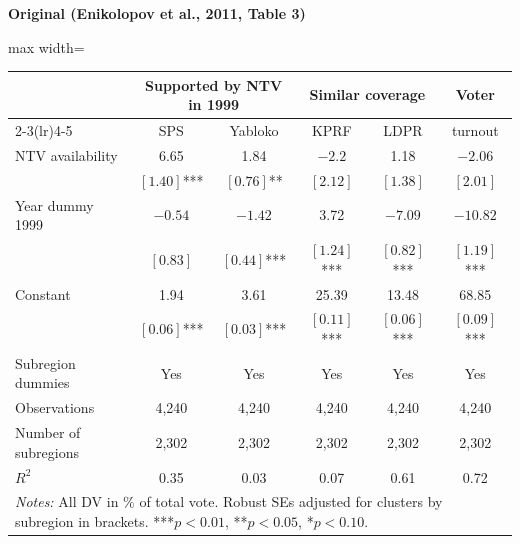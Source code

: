 \documentclass[11pt,a4paper]{article}
\begin{document}
\vspace{0.5cm}
\begin{minipage}[t]{0.48\textwidth}
\centering
\textbf{\large Original (Enikolopov et al., 2011, Table 3)}
\vspace{0.3cm}

\begin{adjustbox}{max width=\textwidth}
\begin{tabular}{lccccc}
\toprule
 & \multicolumn{2}{c}{Supported by NTV in 1999} & \multicolumn{2}{c}{Similar coverage} & Voter \\
\cmidrule(lr){2-3}\cmidrule(lr){4-5}
 & SPS & Yabloko & KPRF & LDPR & turnout \\
\midrule
NTV availability & 6.65 & 1.84 & $-2.2$ & 1.18 & $-2.06$ \\
 & $[1.40]$*** & $[0.76]$** & $[2.12]$ & $[1.38]$ & $[2.01]$ \\[0.3em]
Year dummy 1999 & $-0.54$ & $-1.42$ & 3.72 & $-7.09$ & $-10.82$ \\
 & $[0.83]$ & $[0.44]$*** & $[1.24]$*** & $[0.82]$*** & $[1.19]$*** \\[0.3em]
Constant & 1.94 & 3.61 & 25.39 & 13.48 & 68.85 \\
 & $[0.06]$*** & $[0.03]$*** & $[0.11]$*** & $[0.06]$*** & $[0.09]$*** \\[0.3em]
\midrule
Subregion dummies & Yes & Yes & Yes & Yes & Yes \\
Observations & 4,240 & 4,240 & 4,240 & 4,240 & 4,240 \\
Number of subregions & 2,302 & 2,302 & 2,302 & 2,302 & 2,302 \\
$R^2$ & 0.35 & 0.03 & 0.07 & 0.61 & 0.72 \\
\bottomrule
\multicolumn{6}{p{0.95\textwidth}}{\footnotesize\textit{Notes:} All DV in \% of total vote. Robust SEs adjusted for clusters by subregion in brackets. ***$p<0.01$, **$p<0.05$, *$p<0.10$.}
\end{tabular}
\end{adjustbox}
\end{minipage}%
\hfill
\end{document}
